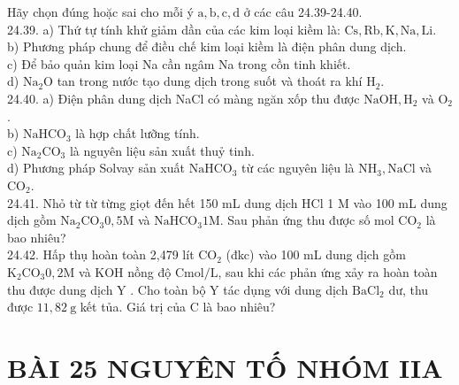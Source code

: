 \documentclass[10pt]{article}
\begin{document}
Hãy chọn đúng hoặc sai cho mỗi ý $\mathrm{a}, \mathrm{b}, \mathrm{c}, \mathrm{d}$ ở các câu 24.39-24.40.\\
24.39. a) Thứ tự tính khử giảm dần của các kim loại kiềm là: $\mathrm{Cs}, \mathrm{Rb}, \mathrm{K}, \mathrm{Na}, \mathrm{Li}$.\\
b) Phương pháp chung để điều chế kim loại kiềm là điện phân dung dịch.\\
c) Để bảo quản kim loại Na cần ngâm Na trong cồn tinh khiết.\\
d) $\mathrm{Na}_{2} \mathrm{O}$ tan trong nước tạo dung dịch trong suốt và thoát ra khí $\mathrm{H}_{2}$.\\
24.40. a) Điện phân dung dịch NaCl có màng ngăn xốp thu được $\mathrm{NaOH}, \mathrm{H}_{2}$ và $\mathrm{O}_{2}$.\\
b) $\mathrm{NaHCO}_{3}$ là hợp chất lưỡng tính.\\
c) $\mathrm{Na}_{2} \mathrm{CO}_{3}$ là nguyên liệu sản xuất thuỷ tinh.\\
d) Phương pháp Solvay sản xuất $\mathrm{NaHCO}_{3}$ từ các nguyên liệu là $\mathrm{NH}_{3}, \mathrm{NaCl}$ và $\mathrm{CO}_{2}$.\\
24.41. Nhỏ từ từ từng giọt đến hết 150 mL dung dịch HCl 1 M vào 100 mL dung dịch gồm $\mathrm{Na}_{2} \mathrm{CO}_{3} 0,5 \mathrm{M}$ và $\mathrm{NaHCO}_{3} 1 \mathrm{M}$. Sau phản ứng thu được số mol $\mathrm{CO}_{2}$ là bao nhiêu?\\
24.42. Hấp thụ hoàn toàn 2,479 lít $\mathrm{CO}_{2}$ (đkc) vào 100 mL dung dịch gồm $\mathrm{K}_{2} \mathrm{CO}_{3} 0,2 \mathrm{M}$ và KOH nồng độ $\mathrm{C} \mathrm{mol} / \mathrm{L}$, sau khi các phản ứng xảy ra hoàn toàn thu được dung dịch Y . Cho toàn bộ Y tác dụng với dung dịch $\mathrm{BaCl}_{2}$ dư, thu được $11,82 \mathrm{~g}$ kết tủa. Giá trị của C là bao nhiêu?

\section*{BÀI 25 NGUYÊN TỐ NHÓM IIA}
\end{document}
